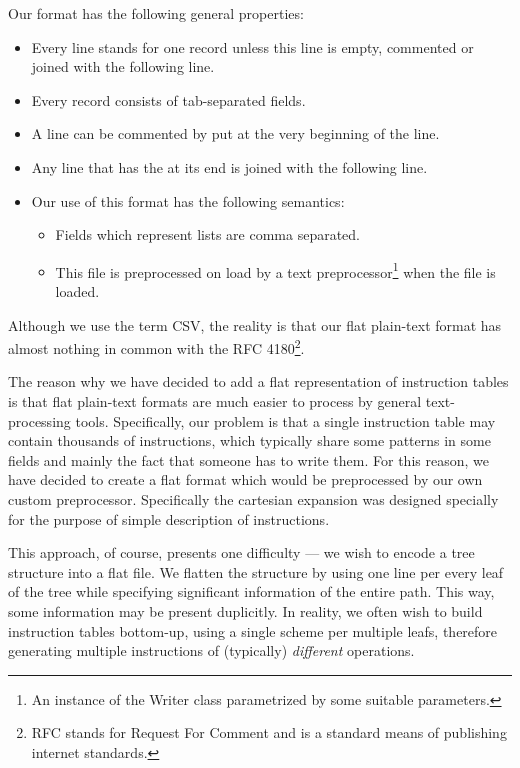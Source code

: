 Our format has the following general properties:
\begin{itemize}
  \item Every line stands for one record unless this line is empty, commented or joined with the following line.
  \item Every record consists of tab-separated fields.
  \item A line can be commented by \ttt{\#} put at the very beginning of the line.
  \item Any line that has the \ttt{\textbackslash} at its end is joined with the following line.
  \item Our use of this format has the following semantics:
  \begin{itemize}
	\item Fields which represent lists are comma separated.
	\item This file is preprocessed on load by a text preprocessor\footnote{An instance of the Writer class parametrized by some suitable parameters.} when the file is loaded.
  \end{itemize}
\end{itemize}

Although we use the term CSV, the reality is that our flat plain-text format has almost nothing in common with the RFC 4180\footnote{RFC stands for Request For Comment and is a standard means of publishing internet standards.}.

The reason why we have decided to add a flat representation of instruction tables is that flat plain-text formats are much easier to process by general text-processing tools. Specifically, our problem is that a single instruction table may contain thousands of instructions, which typically share some patterns in some fields and mainly the fact that someone has to write them. For this reason, we have decided to create a flat format which would be preprocessed by our own custom preprocessor. Specifically the cartesian expansion was designed specially for the purpose of simple description of instructions.

This approach, of course, presents one difficulty --- we wish to encode a tree structure into a flat file. We flatten the structure by using one line per every leaf of the tree while specifying significant information of the entire path. This way, some information may be present duplicitly. In reality, we often wish to build instruction tables bottom-up, using a single scheme per multiple leafs, therefore generating multiple instructions of (typically) \emph{different} operations. 

